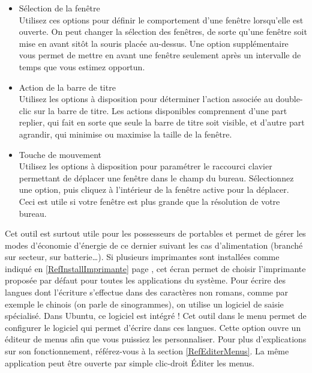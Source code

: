 \begin{itemize}
\item Sélection de la fenêtre\\
Utilisez ces options pour définir le comportement d'une fenêtre lorsqu'elle est ouverte. On peut changer la sélection des fenêtres, de sorte qu'une fenêtre soit mise en avant sitôt la souris placée au-dessus. Une option supplémentaire vous permet de mettre en avant une fenêtre seulement après un intervalle de temps que vous estimez opportun. 
\item Action de la barre de titre\\
Utilisez les options à disposition pour déterminer l'action associée au double-clic sur la barre de titre. Les actions disponibles comprennent d'une part replier, qui fait en sorte que seule la barre de titre soit visible, et d'autre part agrandir, qui minimise ou maximise la taille de la fenêtre. 
\item Touche de mouvement\\
Utilisez les options à disposition pour paramétrer le raccourci clavier permettant de déplacer une fenêtre dans le champ du bureau. Sélectionnez une option, puis cliquez à l'intérieur de la fenêtre active pour la déplacer. Ceci est utile si votre fenêtre est plus grande que la résolution de votre bureau. 
\end{itemize}
Cet outil est surtout utile pour les possesseurs de portables et permet de gérer les modes d'économie d'énergie de ce dernier suivant les cas d'alimentation (branché sur secteur, sur batterie\ldots{}).
Si plusieurs imprimantes sont installées comme indiqué en \ref{RefInstallImprimante} page \pageref{RefInstallImprimante}, cet écran permet de choisir l'imprimante proposée par défaut pour toutes les applications du système.
Pour écrire des langues dont l'écriture s'effectue dans des caractères non romans, comme par exemple le chinois (on parle de sinogrammes), on utilise un logiciel de saisie spécialisé. Dans Ubuntu, ce logiciel est intégré ! Cet outil dans le menu permet de configurer le logiciel qui permet d'écrire dans ces langues.
Cette option ouvre un éditeur de menus afin que vous puissiez les personnaliser. Pour plus d'explications sur son fonctionnement, référez-vous à la section \ref{RefEditerMenus}. La même application peut être ouverte par simple clic-droit \FlecheDroite Éditer les menus.
